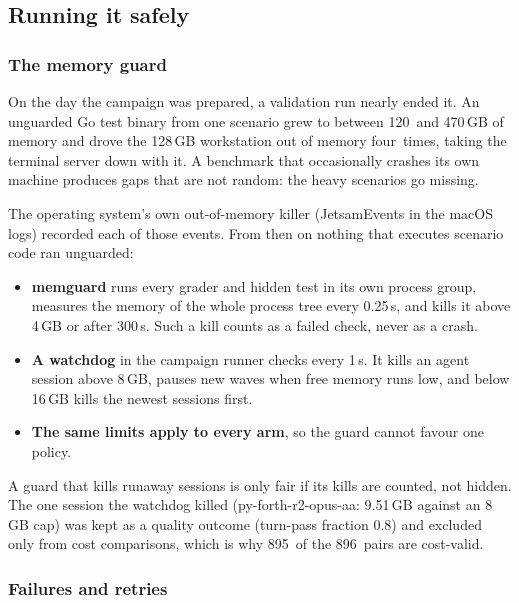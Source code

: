 \documentclass[11pt,letterpaper]{article}
\newcommand{\KillCap}{8}
\newcommand{\KillRSS}{9.51}
\newcommand{\KillSession}{py-forth-r2-opus-aa}
\newcommand{\KillTurnPass}{0.8}
\newcommand{\MemGraderGB}{4}
\newcommand{\MemGraderS}{300}
\newcommand{\MemGrowHigh}{470}
\newcommand{\MemGrowLow}{120}
\newcommand{\MemHardFloorGB}{16}
\newcommand{\MemMacGB}{128}
\newcommand{\MemPollS}{0.25}
\newcommand{\MemTimes}{four}
\newcommand{\MemWatchS}{1}
\newcommand{\NPairs}{896}
\newcommand{\NPairsValid}{895}
\begin{document}
\subsection{Running it safely}\label{vt:sec:running}

\subsubsection{The memory guard}

On the day the campaign was prepared, a validation run nearly ended it. An unguarded Go test binary from
one scenario grew to between \MemGrowLow\ and \MemGrowHigh\,GB of memory and drove the
\MemMacGB\,GB workstation out of memory \MemTimes\ times, taking the terminal server down with it. A
benchmark that occasionally crashes its own machine produces gaps that are not random: the heavy scenarios
go missing.

The operating system's own out-of-memory killer (JetsamEvents in the macOS logs) recorded each of those events. From then on nothing that executes scenario code ran unguarded:
\begin{itemize}
  \item \textbf{memguard} runs every grader and hidden test in its own process group, measures the memory
    of the whole process tree every \MemPollS\,s, and kills it above \MemGraderGB\,GB or after
    \MemGraderS\,s. Such a kill counts as a failed check, never as a crash.
  \item \textbf{A watchdog} in the campaign runner checks every \MemWatchS\,s. It kills an agent session
    above \KillCap\,GB, pauses new waves when free memory runs low, and below \MemHardFloorGB\,GB kills the
    newest sessions first.
  \item \textbf{The same limits apply to every arm}, so the guard cannot favour one policy.
\end{itemize}

\begin{keyidea}
A guard that kills runaway sessions is only fair if its kills are counted, not hidden. The one session the
watchdog killed (\KillSession: \KillRSS\,GB against an \KillCap\,GB cap) was kept as a quality outcome
(turn-pass fraction \KillTurnPass) and excluded only from cost comparisons, which is why
\NPairsValid\ of the \NPairs\ pairs are cost-valid.
\end{keyidea}

\subsubsection{Failures and retries}
\end{document}
